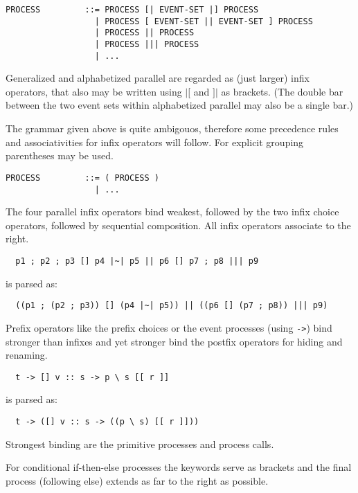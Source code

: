 \documentclass{article}
\begin{document}
\begin{verbatim}
PROCESS         ::= PROCESS [| EVENT-SET |] PROCESS
                  | PROCESS [ EVENT-SET || EVENT-SET ] PROCESS
                  | PROCESS || PROCESS
                  | PROCESS ||| PROCESS
                  | ...
\end{verbatim}

Generalized and alphabetized parallel are regarded as (just larger) infix
operators, that also may be written using $|[$ and $]|$ as brackets. (The
double bar between the two event sets within alphabetized parallel may also be
a single bar.)

The grammar given above is quite ambigouos, therefore some precedence rules
and associativities for infix operators will follow. For explicit grouping
parentheses may be used.

\begin{verbatim}
PROCESS         ::= ( PROCESS )
                  | ...
\end{verbatim}

The four parallel infix operators bind weakest, followed by the two infix
choice operators, followed by sequential composition. All infix operators
associate to the right.

\begin{verbatim}
  p1 ; p2 ; p3 [] p4 |~| p5 || p6 [] p7 ; p8 ||| p9
\end{verbatim}

is parsed as:

\begin{verbatim}
  ((p1 ; (p2 ; p3)) [] (p4 |~| p5)) || ((p6 [] (p7 ; p8)) ||| p9)
\end{verbatim}

Prefix operators like the prefix choices or the event processes (using \verb|->|)
bind stronger than infixes and yet stronger bind the postfix operators for
hiding and renaming.

\begin{verbatim}
  t -> [] v :: s -> p \ s [[ r ]]
\end{verbatim}

is parsed as:

\begin{verbatim}
  t -> ([] v :: s -> ((p \ s) [[ r ]]))
\end{verbatim}

Strongest binding are the primitive processes and process calls.

For conditional if-then-else processes the keywords serve as brackets and the
final process (following else) extends as far to the right as possible.
\end{document}
